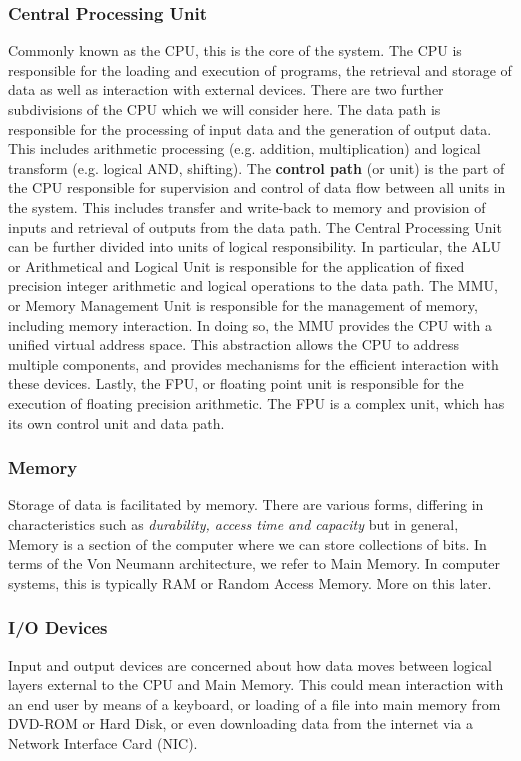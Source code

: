 \documentclass[10pt,a4paper]{article}
\begin{document}
\subsubsection{Central Processing Unit}
Commonly known as the CPU, this is the core of the system. The CPU is responsible for the loading and execution of programs, the retrieval and storage of data as well as interaction with external devices. There are two further subdivisions of the CPU which we will consider here. The data path is responsible for the processing of input data and the generation of output data. This includes arithmetic processing (e.g. addition, multiplication) and logical transform (e.g. logical AND, shifting). The {\bf control path} (or unit) is the part of the CPU responsible for supervision and control of data flow between all units in the system. This includes transfer and write-back to memory and provision of inputs and retrieval of outputs from the data path. 
\newline
\newline
The Central Processing Unit can be further divided into units of logical responsibility. In particular, the ALU or Arithmetical and Logical Unit is responsible for the application of fixed precision integer arithmetic and logical operations to the data path. The MMU, or Memory Management Unit is responsible for the management of memory, including memory interaction. In doing so, the MMU provides the CPU with a unified virtual address space. This abstraction allows the CPU to address multiple components, and provides mechanisms for the efficient interaction with these devices.  Lastly, the FPU, or floating point unit is responsible for the execution of floating precision arithmetic. The FPU is a complex unit, which has its own control unit and data path. 
\subsubsection{Memory}
Storage of data is facilitated by memory. There are various forms, differing in characteristics such as {\it durability, access time and capacity} but in general, Memory is a section of the computer where we can store collections of bits. In terms of the Von Neumann architecture, we refer to Main Memory. In computer systems, this is typically RAM or Random Access Memory. More on this later. 
\subsubsection{I/O Devices}
Input and output devices are concerned about how data moves between logical layers external to the CPU and Main Memory. This could mean interaction with an end user by means of a keyboard, or loading of a file into main memory from DVD-ROM or Hard Disk, or even downloading data from the internet via a Network Interface Card (NIC).
\end{document}
